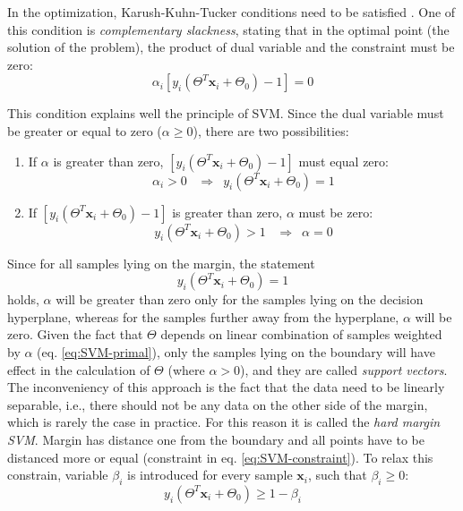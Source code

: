 In the optimization, Karush-Kuhn-Tucker conditions need to be satisfied \citep{Boyd2004}. One of this condition is \emph{complementary slackness}, stating that in the optimal point (the solution of the problem), the product of dual variable and the constraint must be zero:
\begin{equation} 
\alpha_i \left[ y_i \left( \Theta^T\mathbf{x}_i + \Theta_0  \right) -1 \right] = 0
\end{equation}

This condition explains well the principle of SVM. Since the dual variable must be greater or equal to zero ($\alpha \geq 0$), there are two possibilities:
\begin{enumerate}
\item
If $\alpha$ is greater than zero, $\left[ y_i \left( \Theta^T\mathbf{x}_i + \Theta_0  \right) -1 \right]$ must equal zero:
\begin{equation} 
\alpha_i > 0 \,\,\,\,\, \Rightarrow \,\,\,  y_i \left( \Theta^T\mathbf{x}_i + \Theta_0  \right) = 1
\end{equation}
\item
If $\left[ y_i \left( \Theta^T\mathbf{x}_i + \Theta_0  \right) -1 \right]$ is greater than zero, $\alpha$ must be zero:
\begin{equation} 
y_i \left( \Theta^T\mathbf{x}_i + \Theta_0  \right) > 1 \,\,\,\,\, \Rightarrow \,\,\,  \alpha = 0
\end{equation}
\end{enumerate}

Since for all samples lying on the margin, the statement  
\begin{equation}
y_i \left( \Theta^T\mathbf{x}_i + \Theta_0  \right) = 1
\end{equation}
\noindent holds, $\alpha$ will be greater than zero only for the samples lying on the decision hyperplane, whereas for the samples further away from the hyperplane, $\alpha$ will be zero. Given the fact that $\Theta$ depends on linear combination of samples weighted by $\alpha$ (eq. \ref{eq:SVM-primal}), only the samples lying on the boundary will have effect in the calculation of $\Theta$ (where $\alpha > 0$), and they are called \emph{support vectors}. The inconveniency of this approach is the fact that the data need to be linearly separable, i.e., there should not be any data on the other side of the margin, which is rarely the case in practice. For this reason it is called the \emph{hard margin SVM}. Margin has distance one from the boundary and all points have to be distanced more or equal (constraint in eq. \ref{eq:SVM-constraint}). To relax this constrain, variable $\beta_i$ is introduced for every sample $\mathbf{x}_i$, such that $\beta_i \geq 0$:
\begin{equation} 
 y_i \left(\Theta^T \mathbf{x}_i + \Theta_0\right) \geq 1 - \beta_i
\end{equation}

